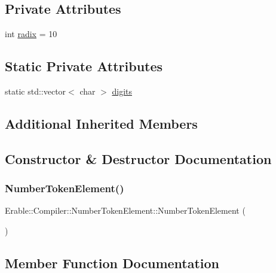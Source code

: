 \subsection*{Private Attributes}
\begin{DoxyCompactItemize}
\item 
int \mbox{\hyperlink{class_erable_1_1_compiler_1_1_number_token_element_a54fa8da39fd33fb0b4a6493dbe02155e}{radix}} = 10
\end{DoxyCompactItemize}
\subsection*{Static Private Attributes}
\begin{DoxyCompactItemize}
\item 
static std\+::vector$<$ char $>$ \mbox{\hyperlink{class_erable_1_1_compiler_1_1_number_token_element_add1035192cf422c8a21f8578b60ff1b1}{digits}}
\end{DoxyCompactItemize}
\subsection*{Additional Inherited Members}


\subsection{Constructor \& Destructor Documentation}
\mbox{\label{class_erable_1_1_compiler_1_1_number_token_element_a6ccd3f7ca622d19dfbc2c1d1fbf23616}} 
\subsubsection{\texorpdfstring{NumberTokenElement()}{NumberTokenElement()}}
{\footnotesize\ttfamily Erable\+::\+Compiler\+::\+Number\+Token\+Element\+::\+Number\+Token\+Element (\begin{DoxyParamCaption}{ }\end{DoxyParamCaption})}



\subsection{Member Function Documentation}
\mbox{\label{class_erable_1_1_compiler_1_1_number_token_element_afcf6c322af0c870ac0ac47229cb4c248}} 

